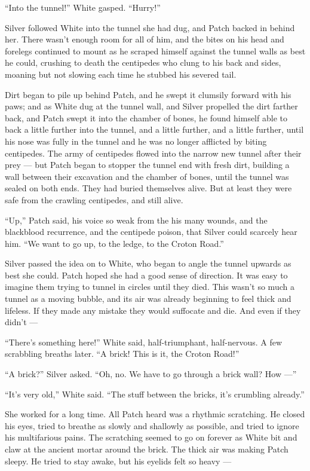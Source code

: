 \documentclass[12pt]{memoir}
\begin{document}
“Into the tunnel!” White gasped. “Hurry!”

Silver followed White into the tunnel she had dug, and Patch backed in
behind her. There wasn’t enough room for all of him, and the bites on
his head and forelegs continued to mount as he scraped himself against
the tunnel walls as best he could, crushing to death the centipedes
who clung to his back and sides, moaning but not slowing each time he
stubbed his severed tail.

Dirt began to pile up behind Patch, and he swept it clumsily forward
with his paws; and as White dug at the tunnel wall, and Silver
propelled the dirt farther back, and Patch swept it into the chamber
of bones, he found himself able to back a little further into the
tunnel, and a little further, and a little further, until his nose was
fully in the tunnel and he was no longer afflicted by biting
centipedes. The army of centipedes flowed into the narrow new tunnel
after their prey — but Patch began to stopper the tunnel end with
fresh dirt, building a wall between their excavation and the chamber
of bones, until the tunnel was sealed on both ends. They had buried
themselves alive. But at least they were safe from the crawling
centipedes, and still alive.

“Up,” Patch said, his voice so weak from the his many wounds, and the
blackblood recurrence, and the centipede poison, that Silver could
scarcely hear him. “We want to go up, to the ledge, to the Croton
Road.”

Silver passed the idea on to White, who began to angle the tunnel
upwards as best she could. Patch hoped she had a good sense of
direction. It was easy to imagine them trying to tunnel in circles
until they died. This wasn’t so much a tunnel as a moving bubble, and
its air was already beginning to feel thick and lifeless. If they made
any mistake they would suffocate and die. And even if they didn’t —

“There’s something here!” White said, half-triumphant, half-nervous. A
few scrabbling breaths later. “A brick! This is it, the Croton Road!”

“A brick?” Silver asked. “Oh, no. We have to go through a brick wall?
How —”

“It’s very old,” White said. “The stuff between the bricks, it’s
crumbling already.”

She worked for a long time. All Patch heard was a rhythmic
scratching. He closed his eyes, tried to breathe as slowly and
shallowly as possible, and tried to ignore his multifarious pains. The
scratching seemed to go on forever as White bit and claw at the
ancient mortar around the brick. The thick air was making Patch
sleepy. He tried to stay awake, but his eyelids felt so heavy —
\end{document}
